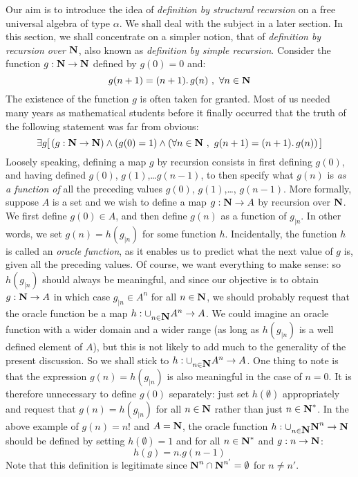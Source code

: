 Our aim is to introduce the idea of {\em definition by structural
recursion} on a free universal algebra of type $\alpha$. We shall
deal with the subject in a later section. In this section, we shall
concentrate on a simpler notion, that of {\em definition by
recursion over $\mbox{$\bf N$}$}, also known as {\em definition by simple
recursion}. Consider the function $g:\mbox{$\bf N$}\to\mbox{$\bf N$}$ defined by $g(0)=0$
and:
    \[
    g(n+1)=(n+1).\,g(n)\ ,\ \forall n\in\mbox{$\bf N$}
    \]
The existence of the function $g$ is often taken for granted. Most
of us needed many years as mathematical students before it finally
occurred that the truth of the following statement was far from
obvious:
    \[
    \exists g[\,(g:\N\to\N)\land(g(0)=1)\land(\forall n\in\N\ ,\ g(n+1)=(n+1).\,g(n))\,]
    \]
Loosely speaking, defining a map $g$ by recursion consists in first
defining $g(0)$, and having defined $g(0)$, $g(1)$,\ldots $g(n-1)$,
to then specify what $g(n)$ is {\em as a function of} all the
preceding values $g(0)$, $g(1)$,\ldots, $g(n-1)$. More formally,
suppose $A$ is a set and we wish to define a map $g:\mbox{$\bf N$}\to A$ by
recursion over $\mbox{$\bf N$}$. We first define $g(0)\in A$, and then define
$g(n)$ as a function of $g_{|n}$. In other words, we set
$g(n)=h(g_{|n})$ for some function $h$. Incidentally, the function
$h$ is called an {\em oracle function}, as it enables us to predict
what the next value of $g$ is, given all the preceding values. Of
course, we want everything to make sense: so $h(g_{|n})$ should
always be meaningful, and since our objective is to obtain $g:\mbox{$\bf N$}\to
A$ in which case $g_{|n}\in A^{n}$ for all $n\in\mbox{$\bf N$}$, we should
probably request that the oracle function be a map
$h:\cup_{n\in\mbox{$\bf N$}}A^{n}\to A$. We could imagine an oracle function
with a wider domain and a wider range (as long as $h(g_{|n})$ is a
well defined element of $A$), but this is not likely to add much to
the generality of the present discussion. So we shall stick to
$h:\cup_{n\in\mbox{$\bf N$}}A^{n}\to A$. One thing to note is that the
expression $g(n)=h(g_{|n})$ is also meaningful in the case of $n=0$.
It is therefore unnecessary to define $g(0)$ separately: just set
$h(\emptyset)$ appropriately and request that $g(n)=h(g_{|n})$ for
all $n\in\mbox{$\bf N$}$ rather than just $n\in\mbox{$\bf N$}^{*}$. In the above example of
$g(n)=n!$ and $A=\mbox{$\bf N$}$, the oracle function
$h:\cup_{n\in\mbox{$\bf N$}}\mbox{$\bf N$}^{n}\to\mbox{$\bf N$}$ should be defined by setting
$h(\emptyset)=1$ and for all $n\in\mbox{$\bf N$}^{*}$ and $g:n\to\mbox{$\bf N$}$:
    \[
    h(g)=n.g(n-1)
    \]
Note that this definition is legitimate since
$\mbox{$\bf N$}^{n}\cap\mbox{$\bf N$}^{n'}=\emptyset$ for $n\neq n'$.

